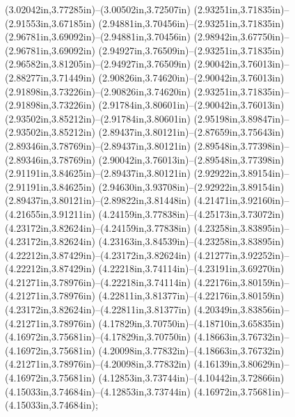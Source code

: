 (3.02042in,3.77285in)--(3.00502in,3.72507in) (2.93251in,3.71835in)--(2.91553in,3.67185in) (2.94881in,3.70456in)--(2.93251in,3.71835in) (2.96781in,3.69092in)--(2.94881in,3.70456in) (2.98942in,3.67750in)--(2.96781in,3.69092in) (2.94927in,3.76509in)--(2.93251in,3.71835in) (2.96582in,3.81205in)--(2.94927in,3.76509in) (2.90042in,3.76013in)--(2.88277in,3.71449in) (2.90826in,3.74620in)--(2.90042in,3.76013in) (2.91898in,3.73226in)--(2.90826in,3.74620in) (2.93251in,3.71835in)--(2.91898in,3.73226in) (2.91784in,3.80601in)--(2.90042in,3.76013in) (2.93502in,3.85212in)--(2.91784in,3.80601in) (2.95198in,3.89847in)--(2.93502in,3.85212in) (2.89437in,3.80121in)--(2.87659in,3.75643in) (2.89346in,3.78769in)--(2.89437in,3.80121in) (2.89548in,3.77398in)--(2.89346in,3.78769in) (2.90042in,3.76013in)--(2.89548in,3.77398in) (2.91191in,3.84625in)--(2.89437in,3.80121in) (2.92922in,3.89154in)--(2.91191in,3.84625in) (2.94630in,3.93708in)--(2.92922in,3.89154in) (2.89437in,3.80121in)--(2.89822in,3.81448in) (4.21471in,3.92160in)--(4.21655in,3.91211in) (4.24159in,3.77838in)--(4.25173in,3.73072in) (4.23172in,3.82624in)--(4.24159in,3.77838in) (4.23258in,3.83895in)--(4.23172in,3.82624in) (4.23163in,3.84539in)--(4.23258in,3.83895in) (4.22212in,3.87429in)--(4.23172in,3.82624in) (4.21277in,3.92252in)--(4.22212in,3.87429in) (4.22218in,3.74114in)--(4.23191in,3.69270in) (4.21271in,3.78976in)--(4.22218in,3.74114in) (4.22176in,3.80159in)--(4.21271in,3.78976in) (4.22811in,3.81377in)--(4.22176in,3.80159in) (4.23172in,3.82624in)--(4.22811in,3.81377in) (4.20349in,3.83856in)--(4.21271in,3.78976in) (4.17829in,3.70750in)--(4.18710in,3.65835in) (4.16972in,3.75681in)--(4.17829in,3.70750in) (4.18663in,3.76732in)--(4.16972in,3.75681in) (4.20098in,3.77832in)--(4.18663in,3.76732in) (4.21271in,3.78976in)--(4.20098in,3.77832in) (4.16139in,3.80629in)--(4.16972in,3.75681in) (4.12853in,3.73744in)--(4.10442in,3.72866in) (4.15033in,3.74684in)--(4.12853in,3.73744in) (4.16972in,3.75681in)--(4.15033in,3.74684in);
